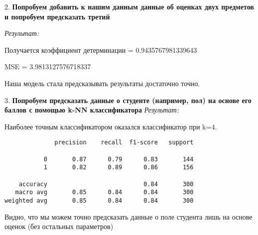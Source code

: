 \documentclass[12pt,a4paper]{article}
\begin{document}
2. \textbf{Попробуем добавить к нашим данным данные об оценках двух предметов и попробуем предсказать третий}

\textit{Результат: } 

Получается коэффициент детерминации = 0.9435767981339643

MSE = 3.9813127576718337

Наша модель стала предсказывать результаты достаточно точно.



3. \textbf{Попробуем предсказать данные о студенте (например, пол) на основе его баллов с помощью k-NN классификатора}
\textit{Результат: } 

Наиболее точным классификатором оказался классификатор при k=4. 

\begin{verbatim}
              precision    recall  f1-score   support

           0       0.87      0.79      0.83       144
           1       0.82      0.89      0.86       156

    accuracy                           0.84       300
   macro avg       0.85      0.84      0.84       300
weighted avg       0.85      0.84      0.84       300
\end{verbatim}

Видно, что мы можем точно предсказать данные о поле студента лишь на основе оценок (без остальных параметров)

\newpage
\end{document}
